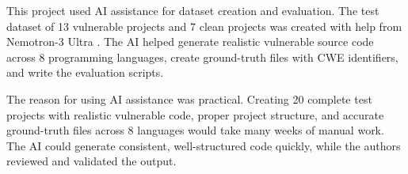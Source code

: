 \documentclass[sigconf,nonacm]{acmart}
\begin{document}
This project used AI assistance for dataset creation and evaluation. The test dataset of 13 vulnerable projects and 7 clean projects was created with help from Nemotron-3 Ultra \cite{nemotron3ultra}. The AI helped generate realistic vulnerable source code across 8 programming languages, create ground-truth files with CWE identifiers, and write the evaluation scripts.

The reason for using AI assistance was practical. Creating 20 complete test projects with realistic vulnerable code, proper project structure, and accurate ground-truth files across 8 languages would take many weeks of manual work. The AI could generate consistent, well-structured code quickly, while the authors reviewed and validated the output.



\end{document}
